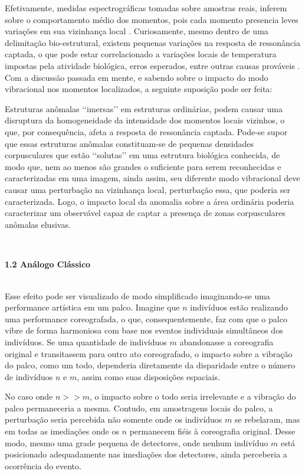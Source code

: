 \documentclass[a4paper, 12pt]{report}
\begin{document}
Efetivamente, medidas espectrográficas tomadas sobre amostras reais, inferem sobre o comportamento médio dos momentos, pois cada momento presencia leves variações em sua vizinhança local \cite{Abragam1961}. Curiosamente, mesmo dentro de uma delimitação bio-estrutural, existem pequenas variações na resposta de ressonância captada, o que pode estar correlacionado a variações locais de temperatura impostas pela atividade biológica, erros esperados, entre outras causas prováveis \cite{Lauterbur1973}. Com a discussão passada em mente, e sabendo sobre o impacto do modo vibracional nos momentos localizados, a seguinte suposição pode ser feita:

Estruturas anômalas {\lq\lq}imersas{\rq\rq} em estruturas ordinárias, podem causar uma disruptura da homogeneidade da intensidade dos momentos locais vizinhos, o que, por consequência, afeta a resposta de ressonância captada. Pode-se supor que essas estruturas anômalas constituam-se de pequenas densidades corpusculares que estão {\lq\lq}solutas{\rq\rq} em uma estrutura biológica conhecida, de modo que, nem ao menos são grandes o suficiente para serem reconhecidas e caracterizadas em uma imagem, ainda assim, seu diferente modo vibracional deve causar uma perturbação na vizinhança local, perturbação essa, que poderia ser caracterizada. Logo, o impacto local da anomalia sobre a área ordinária poderia caracterizar um observável capaz de captar a presença de zonas corpusculares anômalas elusivas.

$\frac{}{}$\\
\begin{Large}
	\textbf{1.2 Análogo Clássico}
\end{Large}
$\frac{}{}$\\

Esse efeito pode ser visualizado de modo simplificado imaginando-se uma performance artística em um palco. Imagine que $n$ indivíduos estão realizando uma performance coreografada, o que, consequentemente, faz com que o palco vibre de forma harmoniosa com base nos eventos individuais simultâneos dos indivíduos. Se uma quantidade de indivíduos $m$ abandonasse a coreografia original e transitassem para outro ato coreografado, o impacto sobre a vibração do palco, como um todo, dependeria diretamente da disparidade entre o número de indivíduos $n$ e $m$, assim como suas disposições espaciais.

No caso onde $n >> m$, o impacto sobre o todo seria irrelevante e a vibração do palco permaneceria a mesma. Contudo, em amostragens locais do palco, a perturbação seria percebida não somente onde os indivíduos $m$ se rebelaram, mas em todas as imediações onde os $n$ permanecem fiéis à coreografia original. Desse modo, mesmo uma grade pequena de detectores, onde nenhum indivíduo $m$ está posicionado adequadamente nas imediações dos detectores, ainda perceberia a ocorrência do evento.
\end{document}
